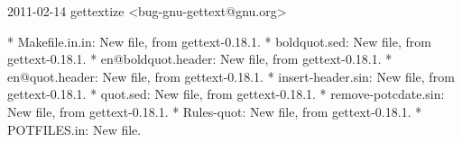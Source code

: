 
\begin{DoxyVerbInclude}
2011-02-14  gettextize  <bug-gnu-gettext@gnu.org>

	* Makefile.in.in: New file, from gettext-0.18.1.
	* boldquot.sed: New file, from gettext-0.18.1.
	* en@boldquot.header: New file, from gettext-0.18.1.
	* en@quot.header: New file, from gettext-0.18.1.
	* insert-header.sin: New file, from gettext-0.18.1.
	* quot.sed: New file, from gettext-0.18.1.
	* remove-potcdate.sin: New file, from gettext-0.18.1.
	* Rules-quot: New file, from gettext-0.18.1.
	* POTFILES.in: New file.

\end{DoxyVerbInclude}
 